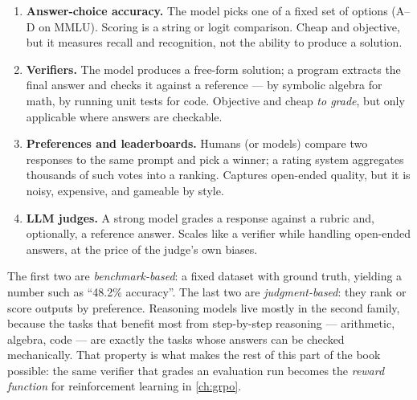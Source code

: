 \begin{enumerate}
  \item \textbf{Answer-choice accuracy.} The model picks one of a fixed set of options (A--D on
  MMLU). Scoring is a string or logit comparison. Cheap and objective, but it measures recall
  and recognition, not the ability to produce a solution.
  \item \textbf{Verifiers.} The model produces a free-form solution; a program extracts the final
  answer and checks it against a reference --- by symbolic algebra for math, by running unit tests
  for code. Objective and cheap \emph{to grade}, but only applicable where answers are checkable.
  \item \textbf{Preferences and leaderboards.} Humans (or models) compare two responses to the
  same prompt and pick a winner; a rating system aggregates thousands of such votes into a
  ranking. Captures open-ended quality, but it is noisy, expensive, and gameable by style.
  \item \textbf{LLM judges.} A strong model grades a response against a rubric and, optionally, a
  reference answer. Scales like a verifier while handling open-ended answers, at the price of the
  judge's own biases.
\end{enumerate}

The first two are \emph{benchmark-based}: a fixed dataset with ground truth, yielding a number
such as ``48.2\% accuracy''. The last two are \emph{judgment-based}: they rank or score outputs
by preference. Reasoning models live mostly in the second family, because the tasks that benefit
most from step-by-step reasoning --- arithmetic, algebra, code --- are exactly the tasks whose
answers can be checked mechanically. That property is what makes the rest of this part of the
book possible: the same verifier that grades an evaluation run becomes the \emph{reward
function} for reinforcement learning in \cref{ch:grpo}.

